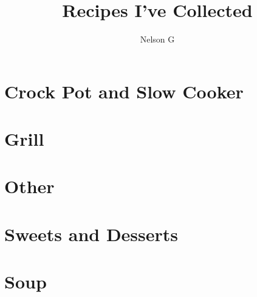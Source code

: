 \documentclass{book}
\title{Recipes I've Collected}
\author{Nelson G}
\begin{document}
\pagestyle{empty}
\maketitle
\tableofcontents

\pagestyle{main}



\chapter{Crock Pot and Slow Cooker}
















\chapter{Grill}


\chapter{Other}



\chapter{Sweets and Desserts}






\chapter{Soup}

\end{document}
